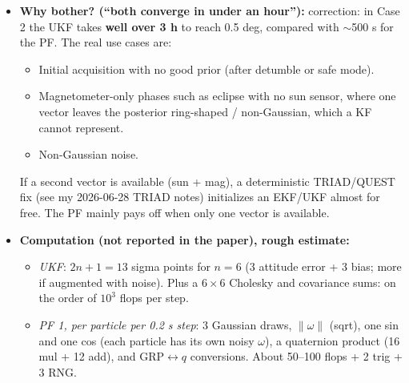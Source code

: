 \documentclass[11pt]{article}
\begin{document}
\begin{itemize}[noitemsep]
\begin{itemize}[noitemsep]
        \item Roughening deliberately injects jitter at every resample, which acts like extra process noise.
        \item The bootstrap proposal ignores the newest measurement, so when the likelihood is tight relative to the prior, few particles land where it matters. That causes degeneracy and frequent resampling.
        \item The dual split ignores the attitude--bias cross-correlation that a joint UKF carries.
        \item Scale of the measurement noise: each TAM sample is only good to roughly $300\,\mathrm{nT}/\|B\|$. For $\|B\| \approx 20$--$50\ \mu$T in LEO, that is $\sim$0.3--0.9 deg. A Kalman filter fuses many such samples with the gyro optimally; the PF's ability to average is limited by resampling and roughening.
    \end{itemize}
    \item \textbf{Why bother? (``both converge in under an hour''):} correction: in Case 2 the UKF takes \textbf{well over 3 h} to reach 0.5 deg, compared with $\sim$500 s for the PF. The real use cases are:
    \begin{itemize}[noitemsep]
        \item Initial acquisition with no good prior (after detumble or safe mode).
        \item Magnetometer-only phases such as eclipse with no sun sensor, where one vector leaves the posterior ring-shaped / non-Gaussian, which a KF cannot represent.
        \item Non-Gaussian noise.
    \end{itemize}
    If a second vector is available (sun + mag), a deterministic TRIAD/QUEST fix (see my 2026-06-28 TRIAD notes) initializes an EKF/UKF almost for free. The PF mainly pays off when only one vector is available.
    \item \textbf{Computation (not reported in the paper), rough estimate:}
    \begin{itemize}[noitemsep]
        \item \textit{UKF}: $2n+1 = 13$ sigma points for $n = 6$ (3 attitude error + 3 bias; more if augmented with noise). Plus a $6\times6$ Cholesky and covariance sums: on the order of $10^3$ flops per step.
        \item \textit{PF 1, per particle per 0.2 s step}: 3 Gaussian draws, $\|\omega\|$ (sqrt), one sin and one cos (each particle has its own noisy $\omega$), a quaternion product (16 mul + 12 add), and GRP$\leftrightarrow q$ conversions. About 50--100 flops + 2 trig + 3 RNG.

\end{itemize}
\end{itemize}
\end{document}
